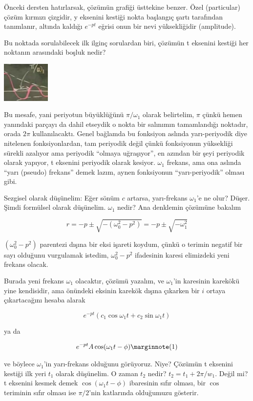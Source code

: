 \documentclass[12pt,fleqn]{article}\usepackage{../../common}
\begin{document}
Önceki dersten hatırlarsak, çözümün grafiği üsttekine benzer. Özel
(particular) çözüm kırmızı çizgidir, y eksenini kestiği nokta başlangıç
şartı tarafından tanımlanır, altında kaldığı $e^{-pt}$ eğrisi onun bir nevi
yüksekliğidir (amplitude). 

Bu noktada sorulabilecek ilk ilginç sorulardan biri, çözümün t eksenini
kestiği her noktanın arasındaki boşluk nedir? 

\includegraphics[height=2cm]{10_3.png}

Bu mesafe, yani periyotun büyüklüğünü $\pi / \omega_1$ olarak belirtelim,
$\pi$ çünkü hemen yanındaki parçayı da dahil etseydik o nokta bir salınımın
tamamlandığı noktadır, orada $2\pi$ kullanılacaktı. Genel bağlamda bu
fonksiyon aslında yarı-periyodik diye nitelenen fonksiyonlardan, tam
periyodik değil çünkü fonksiyonun yüksekliği sürekli azalıyor ama periyodik
``olmaya uğraşıyor'', en azından bir şeyi periyodik olarak yapıyor, t
eksenini periyodik olarak kesiyor. $\omega_1$ frekans, ama ona aslında
``yarı (pseudo) frekans'' demek lazım, aynen fonksiyonun ``yarı-periyodik''
olması gibi.

Sezgisel olarak düşünelim: Eğer sönüm $c$ artarsa, yarı-frekans
$\omega_1$'e ne olur? Düşer. Şimdi formülsel olarak düşünelim. $\omega_1$
nedir? Ana denklemin çözümüne bakalım

$$ r = -p \pm \sqrt{-(\omega_0^2 - p^2)} = -p \pm \sqrt{-\omega_1^2}$$

$(\omega_0^2-p^2)$ parentezi dışına bir eksi işareti koydum, çünkü o terimin
negatif bir sayı olduğunu vurgulamak istedim, $\omega_0^2-p^2$ ifadesinin
karesi elimizdeki yeni frekans olacak. 

Burada yeni frekans $\omega_1$ olacaktır, çözümü yazalım, ve $\omega_1$'in
karesinin karekökü yine kendisidir, ama önündeki eksinin karekök dışına
çıkarken bir $i$ ortaya çıkartacağını hesaba alarak

$$ e^{-pt}(c_1 \cos \omega_1 t + c_2 \sin \omega_1 t) $$

ya da 

$$
 e^{-pt} A \cos (\omega_1 t - \phi) 
\mlabel{1}
$$

ve böylece $\omega_1$'in yarı-frekans olduğunu görüyoruz. Niye? Çözümün t
eksenini kestiği ilk yeri $t_1$ olarak düşünelim. O zaman $t_2$ nedir? 
$t_2 = t_1 + 2\pi / w_1$. Değil mi? t eksenini kesmek demek $\cos (\omega_1 t -
\phi)$ ibaresinin sıfır olması, bir $\cos$ teriminin sıfır olması ise
$\pi/2$'nin katlarında olduğumuzu gösterir.  
\end{document}
